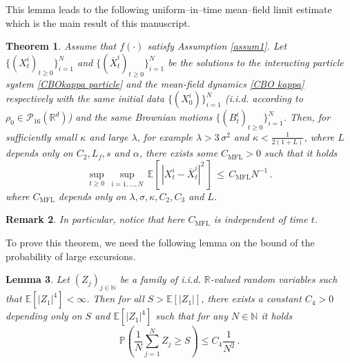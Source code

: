 \documentclass[12pt]{amsart}
\newcommand{\RR}{{\mathbb R}}
\newcommand{\EE}{{\mathbb E}}
\newcommand{\NN}{{\mathbb N}}
\newcommand{\OX}{{\overline{X}}}
\numberwithin{equation}{section}
\newtheorem{theorem}{Theorem}[section]
\newtheorem{lemma}[theorem]{Lemma}
\newtheorem{remark}[theorem]{Remark}
\begin{document}
This lemma leads to the following uniform--in--time mean--field limit estimate which is the main result of this manuscript. 
\begin{theorem}\label{thmmean}
	Assume that  $f(\cdot)$ satisfy Assumption \ref{assum1}. Let $\{(X_t^i)_{t\geq 0}\}_{i=1}^N$ and $\{(\OX_t^i)_{t\geq 0}\}_{i=1}^N$ be the solutions to the interacting particle system \eqref{CBOkappa particle} and the mean-field dynamics \eqref{CBO kappa} respectively  with the same initial data $\{(X_0^i)\}_{i=1}^N$ (i.i.d. according to $\rho_0\in \mathscr{P}_{16}(\RR^d)$) and the same Brownian motions $\{(B_t^i)_{t\geq 0}\}_{i=1}^N$. Then, for sufficiently small $\kappa$ and large $\lambda$, for example $\lambda > 3\,\sigma^{2}$ and $\kappa<\frac{1}{2(1+L)}$,  where $L$ depends only on $C_2,L_f,s$ and $\alpha$, there  exists some $C_{\mathrm{MFL}}>0$ such that it holds
	\begin{equation}
		\sup\limits_{t\geq 0}\,\sup\limits_{i=1,\dots,N}\,\EE[\,|X_t^i-\OX_t^i|^2\,]\,\leq\, C_{\mathrm{MFL}}N^{-1}\,.
	\end{equation}
	where  $C_{\mathrm{MFL}}$ depends only on $\lambda,\sigma,\kappa,C_2,C_3$ and $L$.
\end{theorem}

\begin{remark}
	In particular, notice that here $C_{\mathrm{MFL}}$ is independent of time $t$.
\end{remark}


To prove this theorem, we need the following lemma on the bound of the probability of large excursions.
\begin{lemma}{\cite[Lemma 2.5]{gerber2023mean} }\label{lemprob}
    Let $(Z_j)_{j\in\NN}$ be a family of i.i.d. $\RR$-valued random variables such that $\EE[|Z_1|^4]<\infty$. Then for all $S>\EE[|Z_1|]$, there exists a constant $C_4>0$ depending only on $S$ and $\EE[|Z_1|^4]$  such that for any $N\in\NN$ it holds
    \begin{equation*}
    \mathbb{P}\left(\frac{1}{N}\sum_{j=1}^{N}Z_j\geq S\right)\leq C_4\frac{1}{N^2}\,.
    \end{equation*}
\end{lemma}
	
\end{document}

